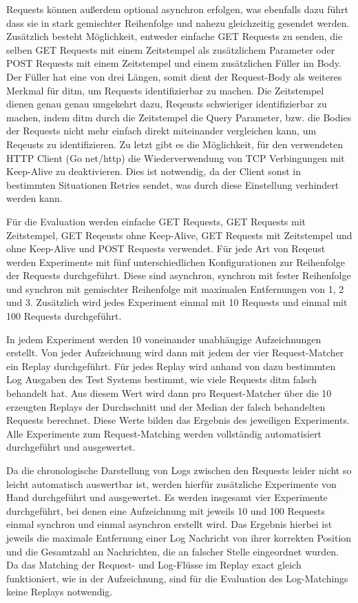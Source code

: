 \documentclass[12pt,a4paper]{report}
\begin{document}
Requests können außerdem optional asynchron erfolgen, was ebenfalls dazu führt dass sie in stark gemischter Reihenfolge und nahezu gleichzeitig
gesendet werden.
Zusätzlich besteht Möglichkeit, entweder einfache GET Requests zu senden, die selben GET Requests mit einem Zeitstempel
als zusätzlichem Parameter oder POST Requests mit einem Zeitstempel und einem zusätzlichen Füller im Body. Der Füller hat eine von
drei Längen, somit dient der Request-Body als weiteres Merkmal für ditm, um Requests identifizierbar zu machen. Die Zeitstempel dienen
genau genau umgekehrt dazu, Reqeusts schwieriger identifizierbar zu machen, indem ditm durch die Zeitstempel die Query Parameter,
bzw. die Bodies der Requests nicht mehr einfach direkt miteinander vergleichen kann, um Reqeusts zu identifizieren.
Zu letzt gibt es die Möglichkeit, für den verwendeten HTTP Client (Go net/http) die Wiederverwendung von TCP Verbingungen mit Keep-Alive
zu deaktivieren. Dies ist notwendig, da der Client sonst in bestimmten Situationen Retries sendet, was durch diese Einstellung
verhindert werden kann.

Für die Evaluation werden einfache GET Requests, GET Requests mit Zeitstempel, GET Reqeusts ohne Keep-Alive, GET Requests mit
Zeitstempel und ohne Keep-Alive und POST Requests verwendet. Für jede Art von Reqeust werden Experimente mit fünf unterschiedlichen
Konfigurationen zur Reihenfolge der Requests durchgeführt. Diese sind asynchron, synchron mit fester Reihenfolge und synchron mit gemischter
Reihenfolge mit maximalen Entfernungen von 1, 2 und 3. Zusätzlich wird jedes Experiment einmal mit 10 Requests und einmal mit 100 Requests
durchgeführt.

In jedem Experiment werden 10 voneinander unabhängige Aufzeichnungen erstellt. Von jeder Aufzeichnung wird dann mit jedem der vier
Request-Matcher ein Replay durchgeführt. Für jedes Replay wird anhand von dazu bestimmten Log Ausgaben des Test Systems bestimmt,
wie viele Requests ditm falsch behandelt hat. Aus diesem Wert wird dann pro Request-Matcher über die 10 erzeugten Replays der Durchschnitt
und der Median der falsch behandelten Requests berechnet. Diese Werte bilden das Ergebnis des jeweiligen Experiments.
Alle Experimente zum Request-Matching werden vollständig automatisiert durchgeführt und ausgewertet. %

Da die chronologische Darstellung von Logs zwischen den Requests leider nicht so leicht automatisch auswertbar ist, werden hierfür
zusätzliche Experimente von Hand durchgeführt und ausgewertet. Es werden insgesamt vier Experimente durchgeführt, bei denen eine
Aufzeichnung mit jeweils 10 und 100 Requests einmal synchron und einmal asynchron erstellt wird. Das Ergebnis hierbei ist jeweils
die maximale Entfernung einer Log Nachricht von ihrer korrekten Position und die Gesamtzahl an Nachrichten, die an falscher Stelle
eingeordnet wurden. Da das Matching der Request- und Log-Flüsse im Replay exact gleich funktioniert, wie in der Aufzeichnung, sind
für die Evaluation des Log-Matchings keine Replays notwendig.
\end{document}
